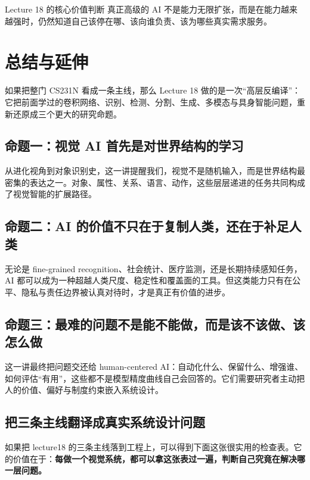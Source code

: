 \documentclass[a4paper]{article}
\begin{document}
\begin{knowledgebox}{Lecture 18 的核心价值判断}
真正高级的 AI 不是能力无限扩张，而是在能力越来越强时，仍然知道自己该停在哪、该向谁负责、该为哪些真实需求服务。
\end{knowledgebox}

\section{总结与延伸}

如果把整门 CS231N 看成一条主线，那么 Lecture 18 做的是一次``高层反编译''：它把前面学过的卷积网络、识别、检测、分割、生成、多模态与具身智能问题，重新还原成三个更大的研究命题。

\subsection{命题一：视觉 AI 首先是对世界结构的学习}

从进化视角到对象识别史，这一讲提醒我们，视觉不是随机输入，而是世界结构最密集的表达之一。对象、属性、关系、语言、动作，这些层层递进的任务共同构成了视觉智能的扩展路径。

\subsection{命题二：AI 的价值不只在于复制人类，还在于补足人类}

无论是 fine-grained recognition、社会统计、医疗监测，还是长期持续感知任务，AI 都可以成为一种超越人类尺度、稳定性和覆盖面的工具。但这类能力只有在公平、隐私与责任边界被认真对待时，才是真正有价值的进步。

\subsection{命题三：最难的问题不是能不能做，而是该不该做、该怎么做}

这一讲最终把问题交还给 human-centered AI：自动化什么、保留什么、增强谁、如何评估``有用''，这些都不是模型精度曲线自己会回答的。它们需要研究者主动把人的价值、偏好与制度约束嵌入系统设计。

\subsection{把三条主线翻译成真实系统设计问题}

如果把 lecture18 的三条主线落到工程上，可以得到下面这张很实用的检查表。它的价值在于：\textbf{每做一个视觉系统，都可以拿这张表过一遍，判断自己究竟在解决哪一层问题。}
\end{document}
